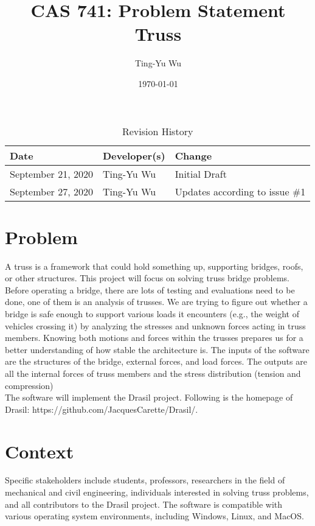 \documentclass{article}
\title{CAS 741: Problem Statement\\Truss}
\author{Ting-Yu Wu}
\date{\today}
\begin{document}
\maketitle

\begin{table}[hp]
\caption{Revision History} \label{TblRevisionHistory}
\begin{tabularx}{\textwidth}{llX}
\toprule
\textbf{Date} & \textbf{Developer(s)} & \textbf{Change}\\
\midrule
September 21, 2020 & Ting-Yu Wu & Initial Draft\\
September 27, 2020 & Ting-Yu Wu & Updates according to issue \#1\\
\bottomrule
\end{tabularx}
\end{table}

\section*{Problem}
A truss is a framework that could hold something up, supporting bridges, roofs, 
or other structures. This project will focus on solving truss bridge problems. 
Before operating a bridge, there are lots of testing and evaluations need to be 
done, one of them is an analysis of trusses. We are trying to figure out 
whether a bridge is safe enough to support various loads it encounters (e.g., 
the weight of vehicles crossing it) by analyzing the stresses and unknown 
forces acting in truss members. Knowing both motions and forces within the 
trusses prepares us for a better understanding of how stable the architecture 
is. The inputs of the software are the structures of the bridge, external 
forces, and load forces. The outputs are all the internal forces of truss 
members and the stress distribution (tension and compression)\\

The software will implement the Drasil project. Following is the homepage of 
Drasil: https://github.com/JacquesCarette/Drasil/.

\section*{Context}
Specific stakeholders include students, professors, researchers in the field of 
mechanical and civil engineering, individuals interested in solving truss 
problems, and all contributors to the Drasil project. The software is 
compatible with various operating system environments, including Windows, 
Linux, and MacOS.
\end{document}
